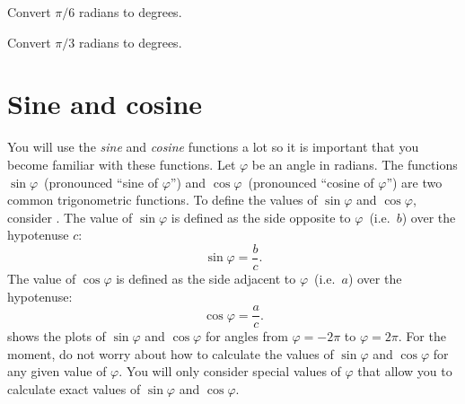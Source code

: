 \documentclass[a4paper,oneside,12pt]{article}
\begin{document}
\begin{exercise}
Convert $\pi / 6$ radians to degrees.
\end{exercise}


\begin{exercise}
Convert $\pi / 3$ radians to degrees.
\end{exercise}




\section{Sine and cosine}

You will use the \emph{sine} and \emph{cosine} functions a lot so it
is important that you become familiar with these functions.  Let
$\varphi$ be an angle in radians.  The functions
$\sin\varphi$~(pronounced ``sine of $\varphi$'') and
$\cos\varphi$~(pronounced ``cosine of $\varphi$'') are two common
trigonometric functions.  To define the values of $\sin\varphi$ and
$\cos\varphi$, consider .
The value of $\sin\varphi$ is defined as the side opposite to
$\varphi$~(i.e.~$b$) over the hypotenuse $c$:
\begin{equation}
\label{eqn:define_sine}
\sin\varphi
=
\frac{b}{c}.
\end{equation}
The value of $\cos\varphi$ is defined as the side adjacent to
$\varphi$~(i.e.~$a$) over the hypotenuse:
\begin{equation}
\label{eqn:define_cosine}
\cos\varphi
=
\frac{a}{c}.
\end{equation}
 shows the plots of $\sin\varphi$ and
$\cos\varphi$ for angles from $\varphi = -2\pi$ to
$\varphi = 2\pi$.  For the moment, do not worry about how to calculate
the values of $\sin\varphi$ and $\cos\varphi$ for any given value of
$\varphi$.  You will only consider special values of $\varphi$ that
allow you to calculate exact values of $\sin\varphi$ and
$\cos\varphi$.
\end{document}

